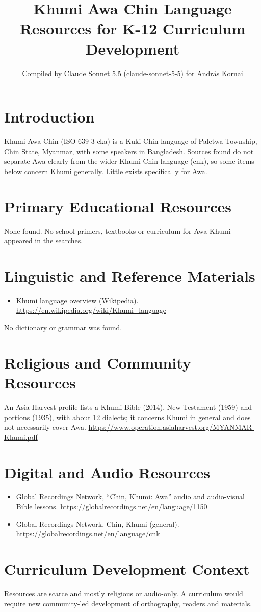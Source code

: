 \documentclass[12pt]{article}
\title{Khumi Awa Chin Language Resources for K-12 Curriculum Development}
\author{Compiled by Claude Sonnet 5.5 (claude-sonnet-5-5) for Andr\'as Kornai}
\date{}
\begin{document}
\maketitle

\section{Introduction}
Khumi Awa Chin (ISO 639-3 cka) is a Kuki-Chin language of Paletwa Township, Chin State, Myanmar, with some speakers in Bangladesh. Sources found do not separate Awa clearly from the wider Khumi Chin language (cnk), so some items below concern Khumi generally. Little exists specifically for Awa.

\section{Primary Educational Resources}
None found. No school primers, textbooks or curriculum for Awa Khumi appeared in the searches.

\section{Linguistic and Reference Materials}
\begin{itemize}
\item Khumi language overview (Wikipedia). \url{https://en.wikipedia.org/wiki/Khumi_language}
\end{itemize}
No dictionary or grammar was found.

\section{Religious and Community Resources}
An Asia Harvest profile lists a Khumi Bible (2014), New Testament (1959) and portions (1935), with about 12 dialects; it concerns Khumi in general and does not necessarily cover Awa. \url{https://www.operation.asiaharvest.org/MYANMAR-Khumi.pdf}

\section{Digital and Audio Resources}
\begin{itemize}
\item Global Recordings Network, ``Chin, Khumi: Awa'' audio and audio-visual Bible lessons. \url{https://globalrecordings.net/en/language/1150}
\item Global Recordings Network, Chin, Khumi (general). \url{https://globalrecordings.net/en/language/cnk}
\end{itemize}

\section{Curriculum Development Context}
Resources are scarce and mostly religious or audio-only. A curriculum would require new community-led development of orthography, readers and materials.
\end{document}
